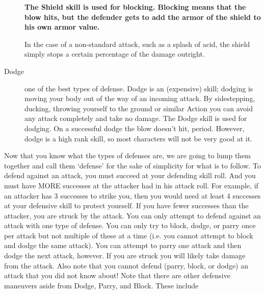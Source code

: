 \documentclass[twoside]{book}
\begin{document}
\begin{description}
 \textbf{ The Shield skill is used for blocking. Blocking
                    means that the blow hits, but the defender gets to
                    add the armor of the shield to his own armor value.
                    }

  In the case of a non-standard attack, such
                    as a splash of acid, the shield simply stops a
                    certain percentage of the damage outright.
                
  \item[ Dodge ]  one of the best types of defense. Dodge is an
                   (expensive) skill; dodging is moving your body out of
                   the way of an incoming attack. By sidestepping,
                   ducking, throwing yourself to the ground or similar
                   Action you can avoid any attack completely and take no
                   damage. The Dodge skill is used for dodging. On a
                   successful dodge the blow doesn't hit, period.
                   However, dodge is a high rank skill, so most
                   characters will not be very good at it. 
\end{description}
   Now that you know what the types of defenses are, we
               are going to lump them together and call them
               `defense' for the sake of simplicity for what
               is to follow.  To defend against an attack, you must succeed at
               your defending skill roll. And you must have MORE
               successes at the attacker had in his attack roll. For
               example, if an attacker has 3 successes to strike you,
               then you would need at least 4 successes at your defensive
               skill to protect yourself. If you have fewer successes
               than the attacker, you are struck by the attack. You can
               only attempt to defend against an attack with one type of
               defense. You can only try to block, dodge, or parry once
               per attack but not multiple of these at a time (i.e. you
               cannot attempt to block and dodge the same attack). You
               can attempt to parry one attack and then dodge the next
               attack, however.  If you are struck you will likely take damage from
               the attack. Also note that you cannot defend (parry,
               block, or dodge) an attack that you did not know about!
                Note that there are other defensive maneuvers
              aside from Dodge, Parry, and Block. These include
\end{document}

